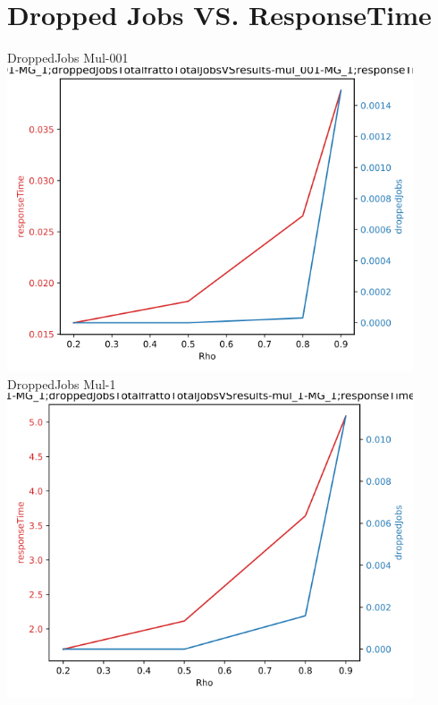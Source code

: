 \documentclass[a4paper]{article}
\begin{document}
\section*{Dropped Jobs VS. ResponseTime}
\begin{center}
DroppedJobs Mul-001 \\
\includegraphics[width=0.9\textwidth]{droppedJobsVSresponseTime-Mul_001-MG_1.png}
DroppedJobs Mul-1 \\
\includegraphics[width=0.9\textwidth]{droppedJobsVSresponseTime-Mul_1-MG_1.png}
\end{center}
\end{document}
